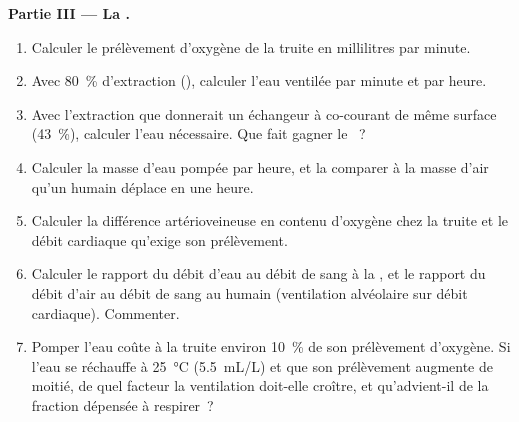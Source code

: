 \begin{problem}
\medskip
\noindent\textbf{Partie III --- La .}
\begin{enumerate}[resume]
  \item Calculer le prélèvement d'oxygène de la truite en millilitres
        par minute.
  \item Avec \qty{80}{\%} d'extraction (), calculer
        l'eau ventilée par minute et par heure.
  \item Avec l'extraction que donnerait un échangeur à co-courant de
        même surface (\qty{43}{\%}), calculer l'eau nécessaire. Que
        fait gagner le ~?
  \item Calculer la masse d'eau pompée par heure, et la comparer à la
        masse d'air qu'un humain déplace en une heure.
  \item Calculer la différence artérioveineuse en contenu d'oxygène
        chez la truite et le débit cardiaque qu'exige son prélèvement.
  \item Calculer le rapport du débit d'eau au débit de sang à la
        , et le rapport du débit d'air au débit de sang au
         humain (ventilation alvéolaire sur débit cardiaque).
        Commenter.
  \item Pomper l'eau coûte à la truite environ \qty{10}{\%} de son
        prélèvement d'oxygène. Si l'eau se réchauffe à
        \qty{25}{\celsius} (\qty{5.5}{mL/L}) et que son prélèvement
        augmente de moitié, de quel facteur la ventilation doit-elle
        croître, et qu'advient-il de la fraction dépensée à respirer~?
\end{enumerate}


\end{problem}
